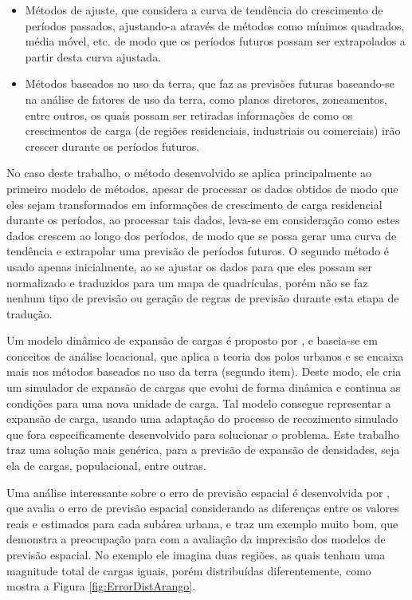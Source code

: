 \begin{itemize}
\item Métodos de ajuste, que considera a curva de tendência do crescimento de períodos passados, ajustando-a através de métodos como mínimos quadrados, média móvel, etc. de modo que os períodos futuros possam ser extrapolados a partir desta curva ajustada.
\item Métodos baseados no uso da terra, que faz as previsões futuras baseando-se na análise de fatores de uso da terra, como planos diretores, zoneamentos, entre outros, os quais possam ser retiradas informações de como os crescimentos de carga (de regiões residenciais, industriais ou comerciais) irão crescer durante os períodos futuros.
\end{itemize}

No caso deste trabalho, o método desenvolvido se aplica principalmente ao primeiro modelo de métodos, apesar de processar os dados obtidos de modo que eles sejam transformados em informações de crescimento de carga residencial durante os períodos, ao processar tais dados, leva-se em consideração como estes dados crescem ao longo dos períodos, de modo que se possa gerar uma curva de tendência e extrapolar uma previsão de períodos futuros. O segundo método é usado apenas inicialmente, ao se ajustar os dados para que eles possam ser normalizado e traduzidos para um mapa de quadrículas, porém não se faz nenhum tipo de previsão ou geração de regras de previsão durante esta etapa de tradução.

Um modelo dinâmico de expansão de cargas é proposto por \citeauthor{arango2000thesis}, e baseia-se em conceitos de análise locacional, que aplica a teoria dos polos urbanos e se encaixa mais nos métodos baseados no uso da terra (segundo item). Deste modo, ele cria um simulador de expansão de cargas que evolui de forma dinâmica e continua as condições para uma nova unidade de carga. Tal modelo consegue representar a expansão de carga, usando uma adaptação do processo de recozimento simulado que fora especificamente desenvolvido para solucionar o problema. Este trabalho traz uma solução mais genérica, para a previsão de expansão de densidades, seja ela de cargas, populacional, entre outras.

Uma análise interessante sobre o erro de previsão espacial é desenvolvida por \citeauthor{arango2000thesis}, que avalia o erro de previsão espacial considerando as diferenças entre os valores reais e estimados para cada subárea urbana, e traz um exemplo muito bom, que demonstra a preocupação para com a avaliação da imprecisão dos modelos de previsão espacial. No exemplo ele imagina duas regiões, as quais tenham uma magnitude total de cargas iguais, porém distribuídas diferentemente, como mostra a Figura \ref{fig:ErrorDistArango}.

